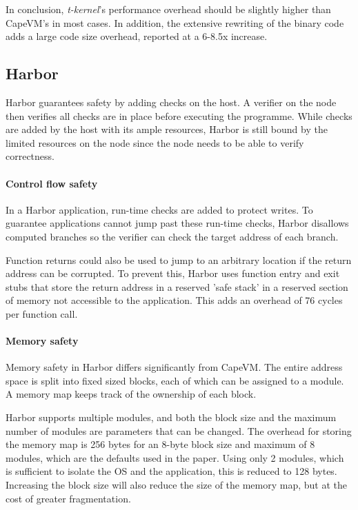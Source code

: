 In conclusion, \emph{t-kernel}'s performance overhead should be slightly higher than CapeVM's in most cases. In addition, the extensive rewriting of the binary code adds a large code size overhead, reported at a 6-8.5x increase.




\subsection{Harbor}
Harbor guarantees safety by adding checks on the host. A verifier on the node then verifies all checks are in place before executing the programme. While checks are added by the host with its ample resources, Harbor is still bound by the limited resources on the node since the node needs to be able to verify correctness.

\paragraph{Control flow safety}
In a Harbor application, run-time checks are added to protect writes. To guarantee applications cannot jump past these run-time checks, Harbor disallows computed branches so the verifier can check the target address of each branch.

Function returns could also be used to jump to an arbitrary location if the return address can be corrupted. To prevent this, Harbor uses function entry and exit stubs that store the return address in a reserved 'safe stack' in a reserved section of memory not accessible to the application. This adds an overhead of 76 cycles per function call.

\paragraph{Memory safety}
Memory safety in Harbor differs significantly from CapeVM. The entire address space is split into fixed sized blocks, each of which can be assigned to a module. A memory map keeps track of the ownership of each block.

Harbor supports multiple modules, and both the block size and the maximum number of modules are parameters that can be changed. The overhead for storing the memory map is 256 bytes for an 8-byte block size and maximum of 8 modules, which are the defaults used in the paper. Using only 2 modules, which is sufficient to isolate the OS and the application, this is reduced to 128 bytes. Increasing the block size will also reduce the size of the memory map, but at the cost of greater fragmentation.

